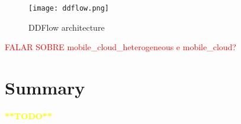 \begin{figure}[h]
\caption{DDFlow architecture}
\label{fig:ddflow}
\centering
\texttt{[image: ddflow.png]}
\end{figure}

\par \textcolor{red}{FALAR SOBRE mobile\_cloud\_heterogeneous e mobile\_cloud?}


\section{Summary}

\textcolor{yellow}{\textbf{**TODO**}}


